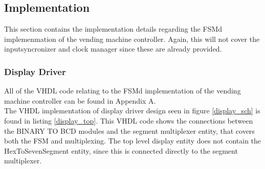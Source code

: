 \subsection{Implementation}
This section contains the implementation details regarding the FSMd implemenmation of the vending machine controller.
Again, this will not cover the inputsyncronizer and clock manager since these are already provided.

\subsubsection{Display Driver}
All of the VHDL code relating to the FSMd implementation of the vending machine controller can be found in Appendix A. \\


The VHDL implementation of display driver design seen in figure \ref{display_sch} is found in listing 
\ref{display_top}.
This VHDL code shows the connections between the BINARY TO BCD modules and the segment multiplexer entity, that covers both the FSM and multiplexing.
The top level display entity does not contain the HexToSevenSegment entity, since this is connected directly to the segment multiplexer.

